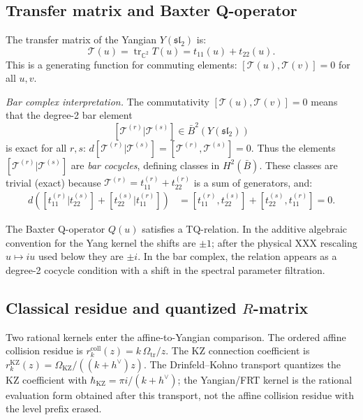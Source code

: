 \subsection{Transfer matrix and Baxter Q-operator}

\begin{computation}
\label{comp:transfer-matrix-bar}

The transfer matrix of the Yangian $Y(\mathfrak{sl}_2)$ is:
\[
\mathcal{T}(u) = \operatorname{tr}_{\mathbb{C}^2} T(u)
= t_{11}(u) + t_{22}(u).
\]
This is a generating function for commuting elements:
$[\mathcal{T}(u), \mathcal{T}(v)] = 0$ for all $u, v$.

\emph{Bar complex interpretation.}
The commutativity $[\mathcal{T}(u), \mathcal{T}(v)] = 0$ means that
the degree-2 bar element
\[
[\mathcal{T}^{(r)} | \mathcal{T}^{(s)}] \in \bar{B}^2(Y(\mathfrak{sl}_2))
\]
is exact for all $r, s$:
$d[\mathcal{T}^{(r)} | \mathcal{T}^{(s)}] = [\mathcal{T}^{(r)},
\mathcal{T}^{(s)}] = 0$.
Thus the elements $[\mathcal{T}^{(r)} | \mathcal{T}^{(s)}]$
are \emph{bar cocycles}, defining classes in $H^2(\bar{B})$.
These classes are trivial (exact) because
$\mathcal{T}^{(r)} = t_{11}^{(r)} + t_{22}^{(r)}$ is a sum
of generators, and:
\begin{align*}
d([t_{11}^{(r)} | t_{22}^{(s)}] + [t_{22}^{(s)} | t_{11}^{(r)}])
&= [t_{11}^{(r)}, t_{22}^{(s)}] + [t_{22}^{(s)}, t_{11}^{(r)}] = 0.
\end{align*}

The Baxter Q-operator $Q(u)$ satisfies a TQ-relation. In the
additive algebraic convention for the Yang kernel the shifts are
\(\pm1\); after the physical XXX rescaling \(u\mapsto iu\) used
below they are \(\pm i\). In the bar complex, the relation appears
as a degree-2 cocycle condition with a shift in the spectral
parameter filtration.
\end{computation}


\subsection{Classical residue and quantized \texorpdfstring{$R$}{R}-matrix}
\label{subsec:quantum-rmatrix-bar}

Two rational kernels enter the affine-to-Yangian comparison. The
ordered affine collision residue is
\(r^{\mathrm{coll}}_k(z)=k\,\Omega_{\mathrm{tr}}/z\). The KZ
connection coefficient is
\(r^{\mathrm{KZ}}_k(z)=\Omega_{\mathrm{KZ}}/((k+h^\vee)z)\). The
Drinfeld--Kohno transport quantizes the KZ coefficient with
\(\hbar_{\mathrm{KZ}}=\pi i/(k+h^\vee)\); the Yangian/FRT kernel is
the rational evaluation form obtained after this transport, not the
affine collision residue with the level prefix erased.

